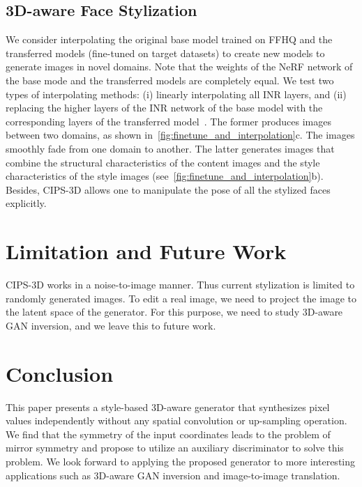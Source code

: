 \documentclass[10pt,twocolumn,letterpaper]{article}
\begin{document}
\subsection{3D-aware Face Stylization}
\label{sec:interpolation}


We consider interpolating the original base model trained on FFHQ and the transferred models (fine-tuned on target datasets) to create new models to generate images in novel domains. Note that the weights of the NeRF network of the base mode and the transferred models are completely equal. We test two types of interpolating methods: (i) linearly interpolating all INR layers, and (ii) replacing the higher layers of the INR network of the base model with the corresponding layers of the transferred model~\cite{pinkney2020Resolution,huang2020Unsupervised}. The former produces images between two domains, as shown in~\cref{fig:finetune_and_interpolation}c. The images smoothly fade from one domain to another. The latter generates images that combine the structural characteristics of the content images and the style characteristics of the style images (see~\cref{fig:finetune_and_interpolation}b). Besides, CIPS-3D allows one to manipulate the pose of all the stylized faces explicitly.




\vspace{-0.1cm}
\section{Limitation and Future Work}
\vspace{-0.1cm}
CIPS-3D works in a noise-to-image manner. Thus current stylization is limited to randomly generated images. To edit a real image, we need to project the image to the latent space of the generator. For this purpose, we need to study 3D-aware GAN inversion, and we leave this to future work.




\vspace{-0.1cm}
\section{Conclusion}
\vspace{-0.1cm}

This paper presents a style-based 3D-aware generator that synthesizes pixel values independently without any spatial convolution or up-sampling operation. We find that the symmetry of the input coordinates leads to the problem of mirror symmetry and propose to utilize an auxiliary discriminator to solve this problem. We look forward to applying the proposed generator to more interesting applications such as 3D-aware GAN inversion and image-to-image translation.


\clearpage
{\small
  
  
}

\clearpage
\end{document}
